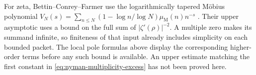 For zeta, Bettin--Conrey--Farmer use the logarithmically tapered
M\"obius polynomial
\(V_N(s)=\sum_{n\le N}(1-\log n/\log N)\mu_{\mathrm M}(n)n^{-s}\)
\cite[Theorem~1, p.~2; Section~3, pp.~5--9]{bettin-conrey-farmer2013}.
Their upper asymptotic uses a bound on the full sum of
\(|\zeta'(\rho)|^{-2}\). A multiple zero makes its summand
infinite, so finiteness of that input already includes simplicity
on each bounded packet. The local pole formulas above display
the corresponding higher-order terms before any such bound is
available. An upper estimate matching the first constant in
\eqref{eq:nyman-multiplicity-excess} has not been proved here.
